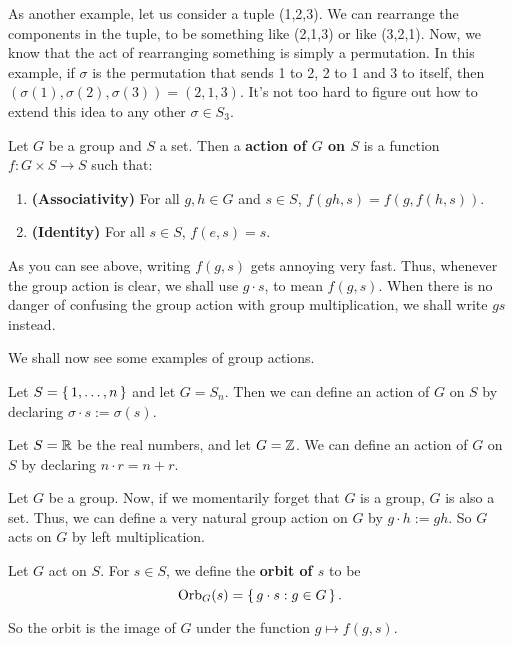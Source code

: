 \documentclass[./main.tex]{subfiles}
\begin{document}
As another example, let us consider a tuple (1,2,3). We can rearrange the
components in the tuple, to be something like (2,1,3) or like (3,2,1). Now, we
know that the act of rearranging something is simply a permutation. In this
example, if $\sigma$ is the permutation that sends 1 to 2, 2 to 1 and 3 to
itself, then $(\sigma(1), \sigma(2), \sigma(3)) = (2,1,3)$. It's not too hard to
figure out how to extend this idea to any other $\sigma \in S_3$.

\begin{definition}
\label{def:group-action}

Let $G$ be a group and $S$ a set. Then a \textbf{action of $G$ on $S$} is a
function $f: G \times S \to S$ such that:
\begin{enumerate}
    \item \textbf{(Associativity)} For all $g, h \in G$ and $s \in S$, $f(gh, s)
    = f(g, f(h,s))$.
    \item \textbf{(Identity)} For all $s \in S$, $f(e,s) = s$.
\end{enumerate}
\end{definition}

As you can see above, writing $f(g,s)$ gets annoying very fast. Thus, whenever
the group action is clear, we shall use $g \cdot s$, to mean $f(g,s)$. When
there is no danger of confusing the group action with group multiplication, we
shall write $gs$ instead.

We shall now see some examples of group actions. 
\begin{example}
    Let $S = \set{1, \dots, n}$ and let $G = S_n$. Then we can define an action
    of $G$ on $S$ by declaring $\sigma \cdot s := \sigma(s)$.
\end{example}

\begin{example}
    Let $S = \mathbb{R}$ be the real numbers, and let $G = \mathbb{Z}$. We can define an
    action of $G$ on $S$ by declaring $n \cdot r = n + r$. 
\end{example}

\begin{example}
    Let $G$ be a group. Now, if we momentarily forget that $G$ is a group, $G$
    is also a set. Thus, we can define a very natural group action on $G$ by $g
    \cdot h := gh$. So $G$ acts on $G$ by left multiplication. 
\end{example}

\begin{definition}[Orbit]
\label{def:group-action-orbit}
    Let $G$ act on $S$. For $s \in S$, we define the \textbf{orbit of $s$} to be 
    \[
        \operatorname{Orb}_G (s) = \set{g \cdot s: g \in G}.
    \]
\end{definition}
So the orbit is the image of $G$ under the function $g \mapsto f(g, s)$.
\end{document}
